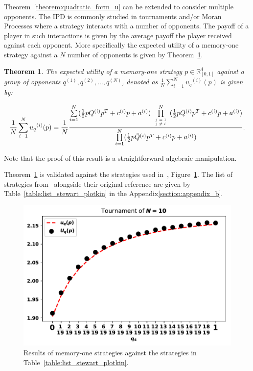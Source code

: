\documentclass[10pt]{article}
\newtheorem{theorem}{Theorem}
\begin{document}
Theorem~\ref{theorem:quadratic_form_u} can be extended to consider multiple
opponents. The IPD is commonly studied in tournaments and/or Moran Processes
where a strategy interacts with a number of opponents. The payoff of a player in
such interactions is given by the average payoff the player received against
each opponent. More specifically the expected utility of a memory-one strategy
against a \(N\) number of opponents is given by
Theorem~\ref{theorem:tournament_utility}.

\begin{theorem}\label{theorem:tournament_utility}
    The expected utility of a memory-one strategy \(p\in\mathbb{R}_{[0,1]}^4\)
    against a group of opponents \(q^{(1)}, q^{(2)}, \dots, q^{(N)}\), denoted
    as \(\frac{1}{N} \sum\limits_{i=1} ^ {N} {u_q}^{(i)} (p)\) is given by:

    \begin{equation}\label{eq:tournament_utility}
        \frac{1}{N} \sum\limits_{i=1} ^ {N} {u_q}^{(i)} (p) = \frac{1}{N}
        \frac{\sum\limits_{i=1} ^ {N} (\frac{1}{2} pQ^{(i)} p^T + c^{(i)} p + a^ {(i)})
        \prod\limits_{\tiny\begin{array}{l} j=1 \\ j \neq i \end{array}} ^
        N (\frac{1}{2} p\bar{Q}^{(i)} p^T + \bar{c}^{(i)} p + \bar{a}^ {(i)})}
        {\prod\limits_{i=1} ^ N (\frac{1}{2} p\bar{Q}^{(i)} p^T + \bar{c}^{(i)} p + \bar{a}^ {(i)})}.
    \end{equation}
\end{theorem}

Note that the proof of this result is a straightforward algebraic manipulation.

Theorem~\ref{theorem:tournament_utility} is validated against the strategies
used in~\cite{Stewart2012}, Figure~\ref{fig:stewart_plotkin_results}. The
list of strategies from~\cite{Stewart2012} alongside their original reference
are given by Table~\ref{table:list_stewart_plotkin} in the Appendix\ref{section:appendix_b}.

\begin{figure}[!htbp]
    \begin{center}
    \includegraphics[width=.5\linewidth]{img/Stewart_tournament_results.pdf}
    \caption{Results of memory-one strategies against the strategies in
    Table~\ref{table:list_stewart_plotkin}.}
    \label{fig:stewart_plotkin_results}
    \end{center}
\end{figure}
\end{document}
